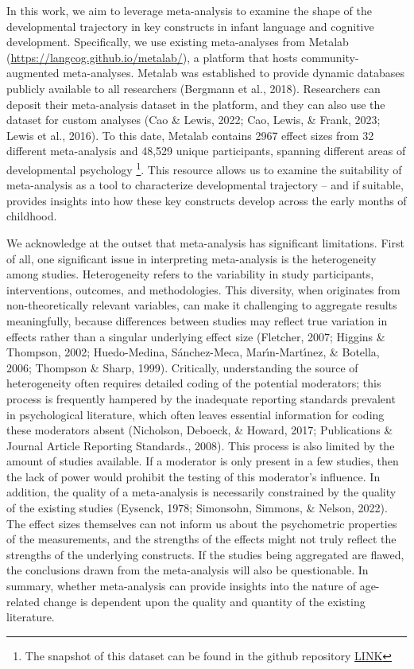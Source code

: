 \documentclass[
  man]{apa6}
\begin{document}
In this work, we aim to leverage meta-analysis to examine the shape of the developmental trajectory in key constructs in infant language and cognitive development. Specifically, we use existing meta-analyses from Metalab (\url{https://langcog.github.io/metalab/}), a platform that hosts community-augmented meta-analyses. Metalab was established to provide dynamic databases publicly available to all researchers (Bergmann et al., 2018). Researchers can deposit their meta-analysis dataset in the platform, and they can also use the dataset for custom analyses (Cao \& Lewis, 2022; Cao, Lewis, \& Frank, 2023; Lewis et al., 2016). To this date, Metalab contains 2967 effect sizes from 32 different meta-analysis and 48,529 unique participants, spanning different areas of developmental psychology \footnote{The snapshot of this dataset can be found in the github repository \href{https://github.com/anjiecao/metalabr_exp}{LINK}}. This resource allows us to examine the suitability of meta-analysis as a tool to characterize developmental trajectory -- and if suitable, provides insights into how these key constructs develop across the early months of childhood.

We acknowledge at the outset that meta-analysis has significant limitations. First of all, one significant issue in interpreting meta-analysis is the heterogeneity among studies. Heterogeneity refers to the variability in study participants, interventions, outcomes, and methodologies. This diversity, when originates from non-theoretically relevant variables, can make it challenging to aggregate results meaningfully, because differences between studies may reflect true variation in effects rather than a singular underlying effect size (Fletcher, 2007; Higgins \& Thompson, 2002; Huedo-Medina, Sánchez-Meca, Marı́n-Martı́nez, \& Botella, 2006; Thompson \& Sharp, 1999). Critically, understanding the source of heterogeneity often requires detailed coding of the potential moderators; this process is frequently hampered by the inadequate reporting standards prevalent in psychological literature, which often leaves essential information for coding these moderators absent (Nicholson, Deboeck, \& Howard, 2017; Publications \& Journal Article Reporting Standards., 2008). This process is also limited by the amount of studies available. If a moderator is only present in a few studies, then the lack of power would prohibit the testing of this moderator's influence. In addition, the quality of a meta-analysis is necessarily constrained by the quality of the existing studies (Eysenck, 1978; Simonsohn, Simmons, \& Nelson, 2022). The effect sizes themselves can not inform us about the psychometric properties of the measurements, and the strengths of the effects might not truly reflect the strengths of the underlying constructs. If the studies being aggregated are flawed, the conclusions drawn from the meta-analysis will also be questionable. In summary, whether meta-analysis can provide insights into the nature of age-related change is dependent upon the quality and quantity of the existing literature.
\end{document}

